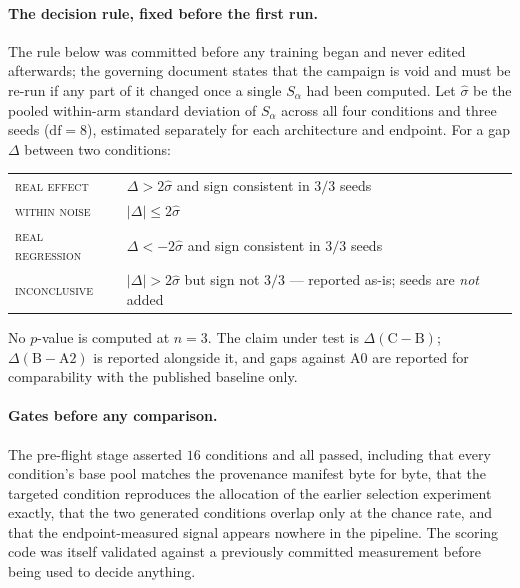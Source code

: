 \documentclass{article}
\begin{document}
\paragraph{The decision rule, fixed before the first run.}
The rule below was committed before any training began and never edited
afterwards; the governing document states that the campaign is void and must be
re-run if any part of it changed once a single $S_\alpha$ had been computed.
Let $\hat{\sigma}$ be the pooled within-arm standard deviation of $S_\alpha$
across all four conditions and three seeds ($\mathrm{df} = 8$), estimated
separately for each architecture and endpoint. For a gap $\Delta$ between two
conditions:
\begin{center}
\begin{tabular}{ll}
\toprule
\textsc{real effect}     & $\Delta > 2\hat{\sigma}$ and sign consistent in $3/3$ seeds \\
\textsc{within noise}    & $|\Delta| \le 2\hat{\sigma}$ \\
\textsc{real regression} & $\Delta < -2\hat{\sigma}$ and sign consistent in $3/3$ seeds \\
\textsc{inconclusive}    & $|\Delta| > 2\hat{\sigma}$ but sign not $3/3$ --- reported as-is; seeds are \emph{not} added \\
\bottomrule
\end{tabular}
\end{center}
No $p$-value is computed at $n = 3$. The claim under test is
$\Delta(\mathrm{C}-\mathrm{B})$; $\Delta(\mathrm{B}-\mathrm{A2})$ is reported
alongside it, and gaps against A0 are reported for comparability with the
published baseline only.

\paragraph{Gates before any comparison.}
The pre-flight stage asserted $16$ conditions and all passed, including that
every condition's base pool matches the provenance manifest byte for byte, that
the targeted condition reproduces the allocation of the earlier selection
experiment exactly, that the two generated conditions overlap only at the chance
rate, and that the endpoint-measured signal appears nowhere in the pipeline.
The scoring code was itself validated against a previously committed
measurement before being used to decide anything.
\end{document}
